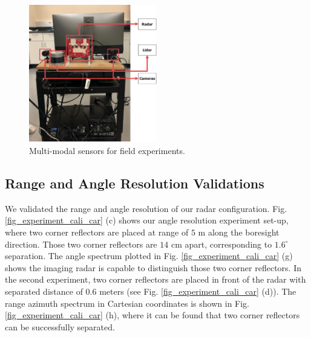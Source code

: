 \documentclass[conference]{IEEEtran}
\begin{document}
\begin{figure}%
\centering
\includegraphics[width=2.2in]{fig/data_collection2.pdf}
\caption{\label{fig_multi_modal_sensors} Multi-modal sensors for field experiments. }
\vspace{-6mm}
\end{figure}
\vspace{-3mm}

\subsection{Range and Angle Resolution Validations}
We validated the range and angle resolution of our radar configuration. Fig. \ref{fig_experiment_cali_car} (c) shows our angle resolution experiment set-up, where two corner reflectors are placed at range of $5$ m along the  boresight direction. Those two corner reflectors are $14$ cm apart, corresponding to $1.6^\circ$ separation. The angle spectrum plotted in Fig. \ref{fig_experiment_cali_car} (g)  shows the imaging radar is capable to distinguish those two corner reflectors. 
In the second experiment, two corner reflectors are placed in front of the radar with separated distance of $0.6$ meters (see Fig. \ref{fig_experiment_cali_car} (d)). The range azimuth spectrum in Cartesian coordinates is shown in Fig. \ref{fig_experiment_cali_car} (h), where it can be found that two corner reflectors can be successfully separated.  
\end{document}
